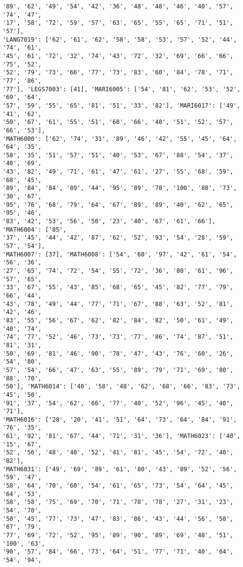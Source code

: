 \documentclass[11pt]{article}
\begin{document}
\begin{Verbatim}[commandchars=\\\{\}]
'89', '62', '49', '54', '42', '36', '48', '48', '46', '40', '57', '74', '47',
'17', '58', '72', '59', '57', '63', '65', '55', '65', '71', '51', '57'],
'LANG7019': ['62', '61', '62', '58', '58', '53', '57', '52', '44', '74', '61',
'45', '61', '72', '32', '74', '43', '72', '32', '69', '66', '66', '75', '52',
'52', '79', '73', '66', '77', '73', '83', '60', '84', '78', '71', '77', '86',
'77'], 'LEGS7003': [41], 'MARI6005': ['54', '81', '62', '53', '52', '69', '64',
'57', '59', '55', '65', '81', '51', '33', '82'], 'MARI6017': ['49', '41', '62',
'50', '67', '61', '55', '51', '68', '66', '48', '51', '52', '57', '66', '53'],
'MATH6000': ['62', '74', '31', '89', '46', '42', '55', '45', '64', '64', '35',
'58', '35', '51', '57', '51', '40', '53', '67', '88', '54', '37', '40', '69',
'43', '82', '49', '71', '61', '47', '61', '27', '55', '68', '59', '68', '45',
'89', '84', '84', '89', '44', '95', '89', '78', '100', '88', '73', '30', '67',
'95', '76', '68', '79', '64', '67', '89', '89', '40', '62', '65', '95', '46',
'83', '42', '53', '56', '50', '23', '40', '67', '61', '66'], 'MATH6004': ['85',
'37', '45', '44', '42', '87', '62', '52', '93', '54', '28', '59', '57', '54'],
'MATH6007': [37], 'MATH6008': ['54', '60', '97', '42', '61', '54', '56', '36',
'27', '65', '74', '72', '54', '55', '72', '36', '80', '61', '96', '57', '65',
'33', '67', '55', '43', '85', '68', '65', '45', '82', '77', '79', '66', '44',
'43', '78', '49', '44', '77', '71', '67', '88', '63', '52', '81', '42', '46',
'83', '55', '56', '67', '62', '82', '84', '82', '50', '61', '49', '40', '74',
'74', '77', '52', '46', '73', '73', '77', '86', '74', '87', '51', '81', '31',
'50', '69', '81', '46', '90', '78', '47', '43', '76', '60', '26', '54', '80',
'57', '54', '66', '47', '63', '55', '89', '79', '71', '69', '80', '88', '70',
'50'], 'MATH6014': ['40', '58', '48', '62', '68', '66', '83', '73', '45', '50',
'91', '37', '54', '62', '66', '77', '40', '52', '96', '45', '40', '71'],
'MATH6016': ['28', '20', '41', '51', '64', '73', '64', '84', '91', '76', '35',
'61', '92', '81', '67', '44', '71', '31', '36'], 'MATH6023': ['40', '15', '67',
'52', '56', '48', '40', '52', '41', '81', '45', '54', '72', '40', '82'],
'MATH6031': ['49', '69', '89', '61', '80', '43', '89', '52', '56', '59', '47',
'58', '64', '70', '60', '54', '61', '65', '73', '54', '64', '45', '64', '53',
'58', '58', '75', '69', '70', '71', '78', '78', '27', '31', '23', '54', '70',
'50', '45', '77', '73', '47', '83', '86', '43', '44', '56', '58', '67', '79',
'77', '69', '72', '52', '95', '89', '90', '89', '69', '48', '51', '100', '63',
'90', '57', '84', '66', '73', '64', '51', '77', '71', '40', '64', '54', '94',

\end{Verbatim}
\end{document}
